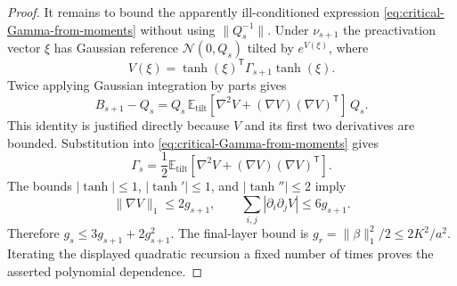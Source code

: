 \begin{proof}
It remains to bound the apparently ill-conditioned expression
\eqref{eq:critical-Gamma-from-moments} without using $\|Q_s^{-1}\|$.
Under $\nu_{s+1}$ the preactivation vector $\xi$ has Gaussian reference
$\mathcal N(0,Q_s)$ tilted by $e^{V(\xi)}$, where
\[
 V(\xi)=\tanh(\xi)^{\mathsf T}\Gamma_{s+1}\tanh(\xi).
\]
Twice applying Gaussian integration by parts gives
\[
 B_{s+1}-Q_s
 =Q_s\,\mathbb E_{\mathrm{tilt}}
       [\nabla^2V+(\nabla V)(\nabla V)^{\mathsf T}]\,Q_s.
\]
This identity is justified directly because $V$ and its first two
derivatives are bounded. Substitution into
\eqref{eq:critical-Gamma-from-moments} gives
\[
 \Gamma_s=\frac12\mathbb E_{\mathrm{tilt}}
       [\nabla^2V+(\nabla V)(\nabla V)^{\mathsf T}].
\]
The bounds $|\tanh|\leq1$, $|\tanh'|\leq1$, and
$|\tanh''|\leq2$ imply
\[
 \|\nabla V\|_1\leq2g_{s+1},\qquad
 \sum_{i,j}|\partial_i\partial_jV|\leq6g_{s+1}.
\]
Therefore $g_s\leq3g_{s+1}+2g_{s+1}^2$.
The final-layer bound is
$g_r=\|\beta\|_1^2/2\leq2K^2/a^2$.
Iterating the displayed quadratic recursion a fixed number of times proves
the asserted polynomial dependence.
\end{proof}
